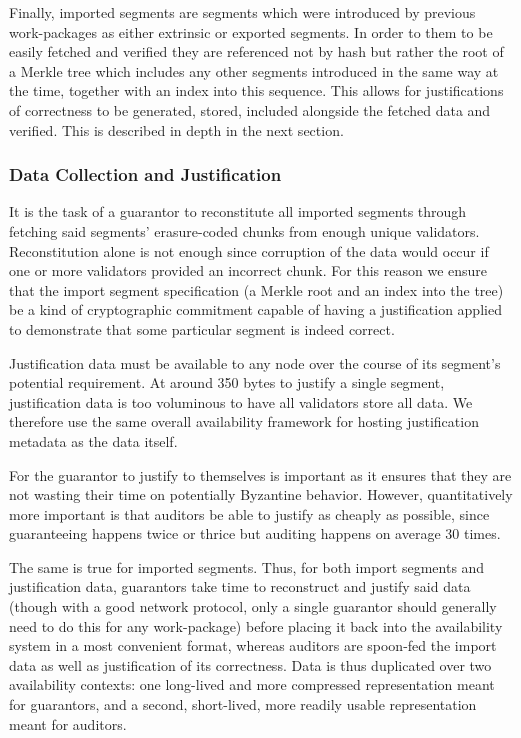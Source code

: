 Finally, imported segments are segments which were introduced by previous work-packages as either extrinsic or exported segments. In order to them to be easily fetched and verified they are referenced not by hash but rather the root of a Merkle tree which includes any other segments introduced in the same way at the time, together with an index into this sequence. This allows for justifications of correctness to be generated, stored, included alongside the fetched data and verified. This is described in depth in the next section.

\subsubsection{Data Collection and Justification}

It is the task of a guarantor to reconstitute all imported segments through fetching said segments' erasure-coded chunks from enough unique validators. Reconstitution alone is not enough since corruption of the data would occur if one or more validators provided an incorrect chunk. For this reason we ensure that the import segment specification (a Merkle root and an index into the tree) be a kind of cryptographic commitment capable of having a justification applied to demonstrate that some particular segment is indeed correct.

Justification data must be available to any node over the course of its segment's potential requirement. At around 350 bytes to justify a single segment, justification data is too voluminous to have all validators store all data. We therefore use the same overall availability framework for hosting justification metadata as the data itself.

For the guarantor to justify to themselves is important as it ensures that they are not wasting their time on potentially Byzantine behavior. However, quantitatively more important is that auditors be able to justify as cheaply as possible, since guaranteeing happens twice or thrice but auditing happens on average 30 times.

The same is true for imported segments. Thus, for both import segments and justification data, guarantors take time to reconstruct and justify said data (though with a good network protocol, only a single guarantor should generally need to do this for any work-package) before placing it back into the availability system in a most convenient format, whereas auditors are spoon-fed the import data as well as justification of its correctness. Data is thus duplicated over two availability contexts: one long-lived and more compressed representation meant for guarantors, and a second, short-lived, more readily usable representation meant for auditors.

